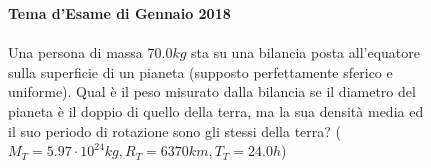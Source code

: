\begin{figure}[h!]
\textbf{Tema d'Esame di Gennaio 2018}\\ \\
Una persona di massa $70.0 kg$ sta su una bilancia posta all’equatore sulla
superficie di un pianeta (supposto perfettamente sferico e uniforme). Qual è il
peso misurato dalla bilancia se il diametro del pianeta è il doppio di quello della
terra, ma la sua densità media ed il suo periodo di rotazione sono gli stessi della
terra? ($M_T = 5.97\cdot 10^{24}kg, R_T = 6370 km, T_T = 24.0 h$) 
\end{figure}